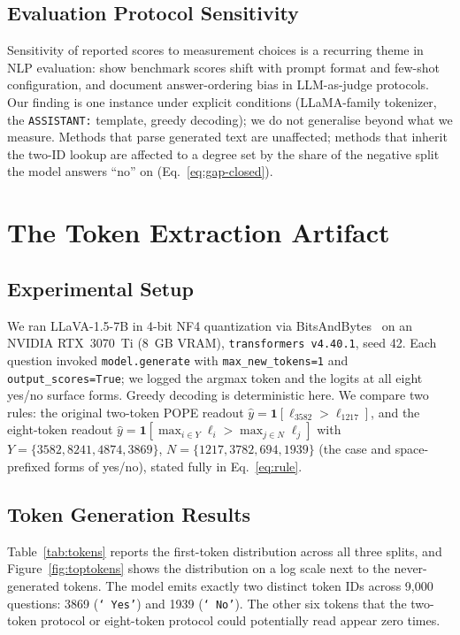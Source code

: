\documentclass{article}
\begin{document}
\subsection{Evaluation Protocol Sensitivity}

Sensitivity of reported scores to measurement choices is a recurring
theme in NLP evaluation: \citet{liang2022holistic} show benchmark scores
shift with prompt format and few-shot configuration, and
\citet{zheng2023judging} document answer-ordering bias in
LLM-as-judge protocols. Our finding is one instance under explicit
conditions (LLaMA-family tokenizer, the \texttt{ASSISTANT:} template,
greedy decoding); we do not generalise beyond what we measure. Methods
that parse generated text are unaffected; methods that inherit the
two-ID lookup are affected to a degree set by the share of the negative
split the model answers ``no'' on (Eq.~\ref{eq:gap-closed}).

\section{The Token Extraction Artifact}
\label{sec:artifact}

\subsection{Experimental Setup}

We ran LLaVA-1.5-7B in 4-bit NF4 quantization via
BitsAndBytes~\citep{dettmers2023qlora} on an NVIDIA RTX~3070~Ti
(8~GB VRAM), \texttt{transformers v4.40.1}, seed 42. Each question
invoked \texttt{model.generate} with \texttt{max\_new\_tokens=1} and
\texttt{output\_scores=True}; we logged the argmax token and the logits
at all eight yes/no surface forms. Greedy decoding is deterministic
here. We compare two rules: the original two-token POPE readout
$\hat{y} = \mathbf{1}[\ell_{3582} > \ell_{1217}]$, and the eight-token
readout $\hat{y} = \mathbf{1}[\max_{i \in Y} \ell_i > \max_{j \in N}
\ell_j]$ with $Y = \{3582, 8241, 4874, 3869\}$,
$N = \{1217, 3782, 694, 1939\}$ (the case and space-prefixed forms of
yes/no), stated fully in Eq.~\ref{eq:rule}.

\subsection{Token Generation Results}

Table~\ref{tab:tokens} reports the first-token distribution across all
three splits, and Figure~\ref{fig:toptokens} shows the distribution on
a log scale next to the never-generated tokens. The model emits exactly
two distinct token IDs across 9{,}000 questions: 3869
(\texttt{`\,Yes'}) and 1939 (\texttt{`\,No'}). The other six tokens
that the two-token protocol or eight-token protocol could potentially
read appear zero times.
\end{document}
